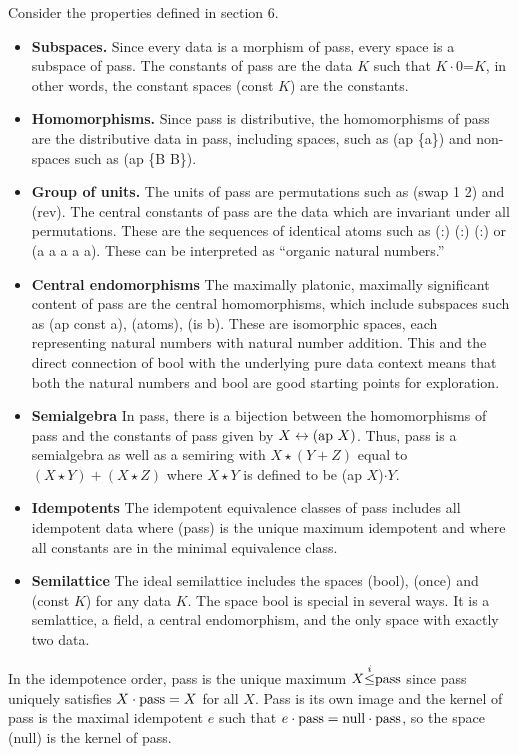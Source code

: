 \documentclass[11pt]{article}
\begin{document}
Consider the properties defined in section 6.  
\begin{itemize}
\item{{\bf Subspaces.}  Since every data is a morphism of pass, every space is a subspace of pass.  The constants of pass are the data $K$ such that 
$K\cdot 0$=$K$, in other words, the constant spaces (const $K$) are the constants.}
\item{{\bf Homomorphisms.} Since pass is distributive, the homomorphisms of pass are the distributive data in pass, including spaces, such as (ap \{a\}) 
and non-spaces such as (ap \{B B\}).} 
\item{{\bf Group of units.} The units of pass are permutations such as (swap 1 2) and (rev).  The central constants of pass are the data which 
are invariant under all permutations.  These are the sequences of identical atoms such as (:) (:) (:) or (a a a a a).  These can be interpreted as ``organic natural numbers.''}
\item{{\bf Central endomorphisms} The maximally platonic, maximally significant content of pass are the central homomorphisms, which include 
subspaces such as (ap const a), (atoms), (is b).  These are isomorphic spaces, each representing natural numbers with natural number 
addition.  This and the direct connection of bool with the underlying pure data context means that 
both the natural numbers and bool are good starting points for exploration.} 
\item{{\bf Semialgebra} In pass, there is a bijection between the homomorphisms of pass and the constants of pass given by $X\leftrightarrow ({\rm ap}\ X)$.  Thus,
pass is a semialgebra as well as a semiring with $X\star (Y+Z)$ equal to $(X\star Y)+(X\star Z)$ where $X\star Y$ is defined to be (ap $X$)$\cdot Y$.}
\item{{\bf Idempotents} The idempotent equivalence classes of pass includes all idempotent data where (pass) is the unique maximum idempotent and where all constants 
are in the minimal equivalence class.}
\item{{\bf Semilattice} The ideal semilattice includes the spaces (bool), (once) and (const $K$) for any data $K$.  The space bool is special in several ways.  
It is a semlattice, a field, a central endomorphism, and the only space with exactly two data.}
\end{itemize}
In the idempotence order, pass is the unique maximum $X{\overset i\leq}{\rm pass}$ since pass uniquely satisfies 
$X\cdot {\rm pass}=X$ for all $X$.  Pass is its own image and the kernel of pass is the maximal idempotent $e$ such that $e\cdot {\rm pass}={\rm null}\cdot{\rm pass}$, 
so the space (null) is the kernel of pass.  
\end{document}
